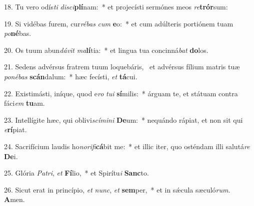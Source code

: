 18. Tu vero odís\textit{ti} \textit{di}\textit{sci}\textbf{plí}nam:~*  et projecísti sermónes meos \textit{re}\textbf{trór}sum:\

19. Si vidébas furem, cur\textit{ré}\textit{bas} \textit{cum} \textbf{e}o:~*  et cum adúlteris portiónem tuam \textit{po}\textbf{né}bas.\

20. Os tuum abun\textit{dá}\textit{vit} \textit{ma}\textbf{lí}tia:~*  et lingua tua concinná\textit{bat} \textbf{do}los.\

21. Sedens advérsus fratrem tuum loquebáris, \dag\  et advérsus fílium matris tuæ \textit{po}\textit{né}\textit{bas} \textbf{scán}dalum:~*  hæc fecísti, \textit{et} \textbf{tá}cui.\

22. Existimásti, iníque, quod e\textit{ro} \textit{tu}\textit{i} \textbf{sí}milis:~*  árguam te, et státuam contra fáci\textit{em} \textbf{tu}am.\

23. Intellígite hæc, qui oblivi\textit{scí}\textit{mi}\textit{ni} \textbf{De}um:~*  nequándo rápiat, et non sit qui \textit{e}\textbf{rí}piat.\

24. Sacrifícium laudis ho\textit{no}\textit{ri}\textit{fi}\textbf{cá}bit me:~*  et illic iter, quo osténdam illi salutá\textit{re} \textbf{De}i.\

25. Glória \textit{Pa}\textit{tri}, \textit{et} \textbf{Fí}lio,~*  et Spirítu\textit{i} \textbf{Sanc}to.\

26. Sicut erat in princípio, \textit{et} \textit{nunc}, \textit{et} \textbf{sem}per,~*  et in sǽcula sæculó\textit{rum}. \textbf{A}men.\

